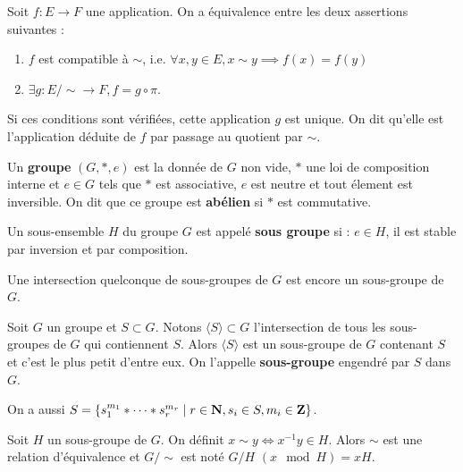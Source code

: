 	\begin{thm}
		Soit $f \colon E \to F$ une application.
		On a équivalence entre les deux assertions suivantes :
		\begin{enumerate}
			\item $f$ est compatible à $\sim$, i.e. $\forall x,y \in E, x \sim y \implies f(x) = f(y)$
			\item $\exists g \colon E/\sim \to F, f = g \circ \pi$.
		\end{enumerate}
		Si ces conditions sont vérifiées, cette application $g$ est unique.
		On dit qu'elle est l'application déduite de $f$ par passage au quotient par $\sim$.
	\end{thm}

	\begin{defn}
		Un \textbf{groupe} $(G,*,e)$ est la donnée de $G$ non vide, $*$ une loi de composition interne et $e \in G$ tels que $*$ est associative, $e$ est neutre et tout élement est inversible.
		On dit que ce groupe est \textbf{abélien} si $*$ est commutative.
	\end{defn}

	\begin{defn}
		Un sous-ensemble $H$ du groupe $G$ est appelé \textbf{sous groupe} si : $e \in H$, il est stable par inversion et par composition.
	\end{defn}

	\begin{pop}
		Une intersection quelconque de sous-groupes de $G$ est encore un sous-groupe de $G$.
	\end{pop}

	\begin{pop}
		Soit $G$ un groupe et $S \subset G$.
		Notons $\langle S \rangle \subset G$ l'intersection de tous les sous-groupes de $G$ qui contiennent $S$.
		Alors $\langle S \rangle$ est un sous-groupe de $G$ contenant $S$ et c'est le plus petit d'entre eux.
		On l'appelle \textbf{sous-groupe} engendré par $S$ dans $G$.
	\end{pop}

	\begin{pop}
		On a aussi $S = \{ s_1^{m_1} * \cdots * s_r^{m_r} \mid r \in \mathbf{N}, s_i \in S, m_i \in \mathbf{Z} \}$.
	\end{pop}

	\begin{pop}
		Soit $H$ un sous-groupe de $G$.
		On définit $x \sim y \iff x^{-1}y \in H$.
		Alors $\sim$ est une relation d'équivalence et $G/\sim$ est noté $G/H$ $(x \mod H) = xH$.
	\end{pop}

